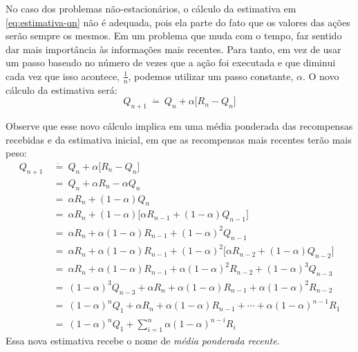\documentclass{article}
\begin{document}
        No caso dos problemas não-estacionários, o cálculo da estimativa em \eqref{eq:estimativa-qn} não é adequada, pois ela parte do fato que os valores das ações serão sempre os mesmos. Em um problema que muda com o tempo, faz sentido dar mais importância às informações mais recentes. Para tanto, em vez de usar um passo baseado no número de vezes que a ação foi executada e que diminui cada vez que isso acontece, $\frac{1}{n}$, podemos utilizar um passo constante, $\alpha$. O novo cálculo da estimativa será:
        \begin{equation}
            Q_{n+1} \ \dot{=} \ Q_n + \alpha \Big[ R_n - Q_n \Big]
        \end{equation}

        Observe que esse novo cálculo implica em uma média ponderada das recompensas recebidas e da estimativa inicial, em que as recompensas mais recentes terão mais peso:
        \begin{subequations}
        \begin{align}
            Q_{n+1} & \ \dot{=} \ Q_n + \alpha \Big[ R_n - Q_n \Big] \nonumber\\
            & \ = \ Q_n + \alpha R_n - \alpha Q_n \nonumber\\
            & \ = \ \alpha R_n + (1 - \alpha) Q_n \nonumber\\
            & \ = \ \alpha R_n + (1 - \alpha) \Big[ \alpha R_{n-1} + (1 - \alpha) Q_{n-1} \Big] \nonumber\\
            & \ = \ \alpha R_n + \alpha (1 - \alpha) R_{n-1} + (1 - \alpha)^2 Q_{n-1} \nonumber\\
            & \ = \ \alpha R_n + \alpha (1 - \alpha) R_{n-1} + (1 - \alpha)^2 \Big[ \alpha R_{n-2} + (1 - \alpha) Q_{n-2} \Big] \nonumber\\
            & \ = \ \alpha R_n + \alpha (1 - \alpha) R_{n-1} + \alpha (1 - \alpha)^2 R_{n-2} + (1 - \alpha)^3 Q_{n-3} \nonumber\\
            & \ = \ (1 - \alpha)^3 Q_{n-3} + \alpha R_n + \alpha (1 - \alpha) R_{n-1} + \alpha (1 - \alpha)^2 R_{n-2} \nonumber\\
            & \ = \ (1 - \alpha)^n Q_1 + \alpha R_n + \alpha (1 - \alpha) R_{n-1} + \cdots + \alpha (1 - \alpha)^{n-1} R_1 \nonumber\\
            & \ = \ (1 - \alpha)^n Q_1 + \sum_{i=1}^{n} \alpha (1 - \alpha)^{n - i} R_i
        \end{align}
        \end{subequations}
        Essa nova estimativa recebe o nome de \emph{média ponderada recente}.
        
\end{document}
